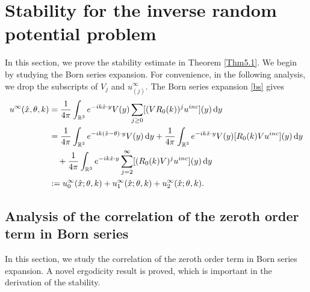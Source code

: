 \documentclass[reqno, 12pt]{amsart}
\numberwithin{equation}{section}
\begin{document}
\section{Stability for the inverse random potential problem}\label{IP}
In this section, we prove the stability estimate in Theorem \ref{Thm5.1}. We begin by studying the Born series expansion.
For convenience, 
in the following analysis, we drop the subscripts of $V_j$ and $u^\infty_{(j)}$. 
The Born series expansion \eqref{bs} gives \begin{align}\label{5.2.2}
	u^\infty(\hat{x},\theta,k)&= \frac{1}{4\pi}  \int_{\mathbb{R}^3} e^{-ik\hat{x} \cdot y}V(y)\sum_{j\ge 0}[(V R_0(k) )^{j} u^{inc}](y)\,\mathrm{d}y \notag\\ &=\frac{1}{4\pi}  \int_{\mathbb{R}^3} e^{-ik(\hat{x}-\theta) \cdot y} V(y)\,\mathrm{d}y+\frac{1}{4\pi}  \int_{\mathbb{R}^3} e^{-ik\hat{x} \cdot y}V(y)[R_0(k)V u^{inc}](y)\,\mathrm{d}y \notag\\ &\quad +\frac{1}{4\pi} \int_{\mathbb{R}^3} e^{-ik\hat{x} \cdot y}\sum^\infty_{j=2}[(R_0(k) V)^{j} u^{inc}](y)\,\mathrm{d}y \notag\\ &:=u_0^\infty(\hat{x};\theta,k) + u_1^\infty(\hat{x};\theta,k) + u_2^\infty(\hat{x};\theta,k).
\end{align} 
\subsection{Analysis of the correlation of the zeroth order term in Born series}
In this section, we study the correlation of the zeroth order term in Born series expansion. A novel ergodicity result is proved, which is important in the derivation of the stability.
\end{document}
